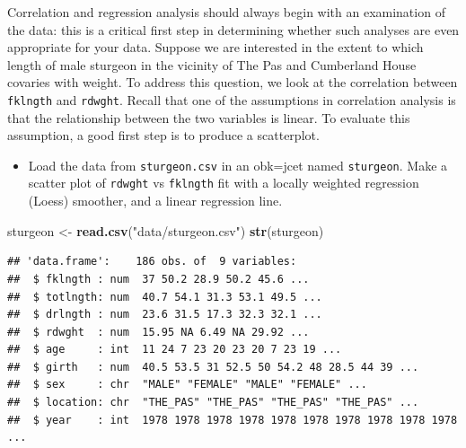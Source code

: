 \documentclass[
  12pt,
]{book}
\newenvironment{Shaded}{\begin{snugshade}}{\end{snugshade}}
\newcommand{\KeywordTok}[1]{\textcolor[rgb]{0.13,0.29,0.53}{\textbf{#1}}}
\newcommand{\NormalTok}[1]{#1}
\newcommand{\StringTok}[1]{\textcolor[rgb]{0.31,0.60,0.02}{#1}}
\providecommand{\tightlist}{%
  \setlength{\itemsep}{0pt}\setlength{\parskip}{0pt}}
\begin{document}
Correlation and regression analysis should always begin with an examination of the data: this is a critical first step in determining whether such analyses are even appropriate for your data.
Suppose we are interested in the extent to which length of male sturgeon in the vicinity of The Pas and Cumberland House covaries with weight. To address this question, we look at the correlation between \texttt{fklngth} and \texttt{rdwght}.
Recall that one of the assumptions in correlation analysis is that the
relationship between the two variables is linear. To evaluate this
assumption, a good first step is to produce a scatterplot.

\begin{itemize}
\tightlist
\item
  Load the data from \texttt{sturgeon.csv} in an obk=jcet named \texttt{sturgeon}.
  Make a scatter plot of \texttt{rdwght} vs \texttt{fklngth} fit with a locally weighted regression (Loess) smoother, and a linear regression line.
\end{itemize}

\begin{Shaded}
\begin{Highlighting}[]
\NormalTok{sturgeon \textless{}{-}}\StringTok{ }\KeywordTok{read.csv}\NormalTok{(}\StringTok{"data/sturgeon.csv"}\NormalTok{)}
\KeywordTok{str}\NormalTok{(sturgeon)}
\end{Highlighting}
\end{Shaded}

\begin{verbatim}
## 'data.frame':    186 obs. of  9 variables:
##  $ fklngth : num  37 50.2 28.9 50.2 45.6 ...
##  $ totlngth: num  40.7 54.1 31.3 53.1 49.5 ...
##  $ drlngth : num  23.6 31.5 17.3 32.3 32.1 ...
##  $ rdwght  : num  15.95 NA 6.49 NA 29.92 ...
##  $ age     : int  11 24 7 23 20 23 20 7 23 19 ...
##  $ girth   : num  40.5 53.5 31 52.5 50 54.2 48 28.5 44 39 ...
##  $ sex     : chr  "MALE" "FEMALE" "MALE" "FEMALE" ...
##  $ location: chr  "THE_PAS" "THE_PAS" "THE_PAS" "THE_PAS" ...
##  $ year    : int  1978 1978 1978 1978 1978 1978 1978 1978 1978 1978 ...
\end{verbatim}
\end{document}
